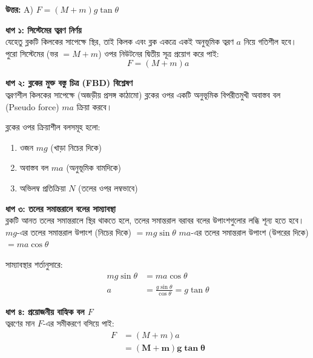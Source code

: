 \documentclass[12pt, a4paper]{article}
\begin{document}
\vspace{0.5em}
\begin{tcolorbox}[answerbox]
    \textbf{\color{success} উত্তর:} A)  $F = (M + m)g \tan\theta$
\end{tcolorbox}
\vspace{1em}

\begin{tcolorbox}[solutionbox={সমাধান (Solution)}]
    \noindent
    \textbf{ধাপ ১: সিস্টেমের ত্বরণ নির্ণয়} \\
    যেহেতু ব্লকটি কিলকের সাপেক্ষে স্থির, তাই কিলক এবং ব্লক একত্রে একই অনুভূমিক ত্বরণ $a$ নিয়ে গতিশীল হবে। পুরো সিস্টেমের (ভর $= M + m$) ওপর নিউটনের দ্বিতীয় সূত্র প্রয়োগ করে পাই:
    \[ F = (M + m)a \]
    
    \vspace{0.5em}
    \noindent\textbf{ধাপ ২: ব্লকের মুক্ত বস্তু চিত্র (FBD) বিশ্লেষণ} \\
    ত্বরণশীল কিলকের সাপেক্ষে (অজড়ীয় প্রসঙ্গ কাঠামো) ব্লকের ওপর একটি অনুভূমিক বিপরীতমুখী অবাস্তব বল (Pseudo force) $ma$ ক্রিয়া করবে। 
    
    ব্লকের ওপর ক্রিয়াশীল বলসমূহ হলো:
    \begin{enumerate}[topsep=0pt, itemsep=0pt]
        \item ওজন $mg$ (খাড়া নিচের দিকে)
        \item অবাস্তব বল $ma$ (অনুভূমিক বামদিকে)
        \item অভিলম্ব প্রতিক্রিয়া $N$ (তলের ওপর লম্বভাবে)
    \end{enumerate}
    
    \vspace{0.5em}
    \noindent\textbf{ধাপ ৩: তলের সমান্তরালে বলের সাম্যাবস্থা} \\
    ব্লকটি আনত তলের সমান্তরালে স্থির থাকতে হলে, তলের সমান্তরাল বরাবর বলের উপাংশগুলোর লব্ধি শূন্য হতে হবে। 
    $mg$-এর তলের সমান্তরাল উপাংশ (নিচের দিকে) $= mg \sin\theta$ 
    $ma$-এর তলের সমান্তরাল উপাংশ (উপরের দিকে) $= ma \cos\theta$
    
    সাম্যাবস্থার শর্তানুসারে:
    \begin{align*}
        mg \sin\theta &= ma \cos\theta \\
        a &= \frac{g \sin\theta}{\cos\theta} = g \tan\theta
    \end{align*}
    
    \vspace{0.5em}
    \noindent\textbf{ধাপ ৪: প্রয়োজনীয় বাহ্যিক বল $F$} \\
    ত্বরণের মান $F$-এর সমীকরণে বসিয়ে পাই:
    \begin{align*}
        F &= (M + m) a \\
          &= \mathbf{(M + m) g \tan\theta}
    \end{align*}
\end{tcolorbox}
\end{document}
